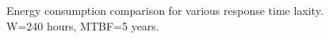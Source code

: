 \begin{figure}[!t]	
	\begin{center}
	\end{center}
	\caption{Energy consumption comparison for various response time laxity. W=240 hours, MTBF=5 years.}
	\label{fig:alpha}
\end{figure}


